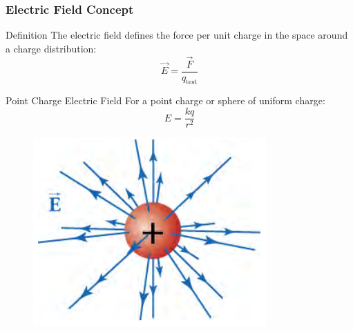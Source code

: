 \documentclass{beamer}
\begin{document}
\begin{frame}
    \frametitle{Electric Field Concept}
    \begin{block}{Definition}
        The electric field defines the force per unit charge in the space around a charge distribution:
        \begin{equation}
            \vec{E} = \frac{\vec{F}}{q_{\text{test}}}
        \end{equation}
    \end{block}
    
    \begin{block}{Point Charge Electric Field}
        For a point charge or sphere of uniform charge:
        \begin{equation}
            E = \frac{kq}{r^2}
        \end{equation}
    \end{block}
    \end{frame}

\begin{frame}
    
        \begin{figure}
            \centering
            \includegraphics[width=0.8\linewidth]{ptchrg.png}
        \end{figure}
    
\end{frame}
\end{document}
